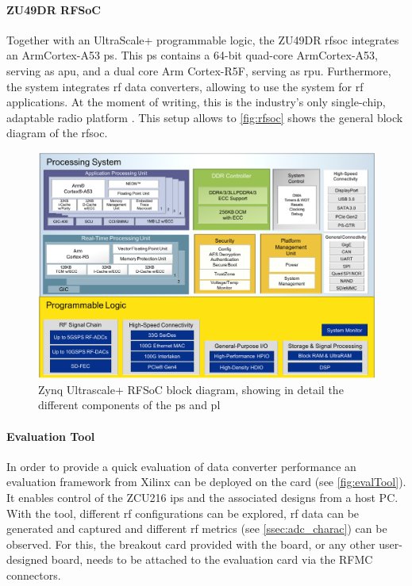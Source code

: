 \paragraph{ZU49DR RFSoC}
Together with an UltraScale+ programmable logic, the ZU49DR \gls{rfsoc} integrates an Arm\textregistered Cortex\texttrademark-A53 \gls{ps}.
This \gls{ps} contains a 64-bit quad-core Arm\textregistered Cortex\texttrademark-A53, serving as \gls{apu}, and a dual core Arm Cortex-R5F, serving as \gls{rpu}.
Furthermore, the system integrates \gls{rf} data converters, allowing to use the system for \gls{rf} applications.
At the moment of writing, this is the industry's only single-chip, adaptable radio platform \cite{zu49}.
This setup allows to 
\autoref{fig:rfsoc} shows the general block diagram of the \gls{rfsoc}.

\begin{figure}[tbh]
	\centering
	\includegraphics[width = \textwidth]{chap/04-work/img/rfsoc_blockdiagram}
	\caption[Zynq Ultrascale+ RFSoC block diagram]{Zynq Ultrascale+ RFSoC block diagram, showing in detail the different components of the \gls{ps} and \gls{pl}}
	\label{fig:rfsoc}
\end{figure}

\paragraph{Evaluation Tool}
In order to provide a quick evaluation of data converter performance an evaluation framework from Xilinx can be deployed on the card (see \autoref{fig:evalTool}). 
It enables control of the ZCU216 \glspl{ip} and the associated designs from a host PC. 
With the tool, different \gls{rf} configurations can be explored, \gls{rf} data can be generated and captured and different \gls{rf} metrics (see \autoref{ssec:adc_charac}) can be observed.  
For this, the breakout card provided with the board, or any other user-designed board, needs to be attached to the evaluation card via the RFMC connectors.

